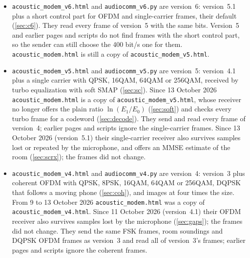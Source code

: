 \documentclass[11pt,a4paper]{article}
\newcommand{\code}[1]{\texttt{#1}}
\theoremstyle{remark}
\begin{document}
\begin{itemize}
again after every pass (\cref{sec:screlearn}); the frames did not change. Version~7.19, on 23 October, adds the fast wide band (\cref{sec:scfast}), whose frames receivers made before version~7.19 ignore; the other frames did not change. Version~7.20, on 23 October, learns the long echo only if a first pass without it fails (\cref{sec:sctail}); the frames did not change. Version~7.21, on 24 October, adds wide OFDM (\cref{sec:ofdmwide}), whose frames receivers made before version~7.21 ignore; the other frames did not change. Version~7.22, the same day, gives wide OFDM a second try with the room's longer echo (\cref{sec:ofdmwide}); the frames did not change. Pages and scripts made before version~7 ignore LDPC frames, and those made before version~7.1 JPEG frames. The LDPC code is not described in this document yet.
\item \code{acoustic\_modem\_v6.html} and \code{audiocomm\_v6.py} are version~6: version~5.1 plus a short control part for OFDM and single-carrier frames, their default (\cref{sec:c6}). They read every frame of version~5 with the same bits. Version~5 and earlier pages and scripts do not find frames with the short control part, so the sender can still choose the 400 bit/s one for them. \code{acoustic\_modem.html} is still a copy of \code{acoustic\_modem\_v5.html}.
\item \code{acoustic\_modem\_v5.html} and \code{audiocomm\_v5.py} are version~5: version~4.1 plus a single carrier with QPSK, 16QAM, 64QAM or 256QAM, received by turbo equalization with soft SMAP (\cref{sec:sc}). Since 13 October 2026 \code{acoustic\_modem.html} is a copy of \code{acoustic\_modem\_v5.html}, whose receiver no longer offers the plain ratio $\ln(E_1/E_0)$ (\cref{sec:soft}) and checks every turbo frame for a codeword (\cref{sec:decode}). They send and read every frame of version~4; earlier pages and scripts ignore the single-carrier frames. Since 13 October 2026 (version~5.1) their single-carrier receiver also survives samples lost or repeated by the microphone, and offers an MMSE estimate of the room (\cref{sec:scrx}); the frames did not change.
\item \code{acoustic\_modem\_v4.html} and \code{audiocomm\_v4.py} are version~4: version~3 plus coherent OFDM with QPSK, 8PSK, 16QAM, 64QAM or 256QAM, DQPSK that follows a moving phone (\cref{sec:coh}), and images at four times the size. From 9 to 13 October 2026 \code{acoustic\_modem.html} was a copy of \code{acoustic\_modem\_v4.html}. Since 11 October 2026 (version~4.1) their OFDM receiver also survives samples lost by the microphone (\cref{sec:gaps}); the frames did not change. They send the same FSK frames, room soundings and DQPSK OFDM frames as version~3 and read all of version~3's frames; earlier pages and scripts ignore the coherent frames.

\end{itemize}
\end{document}
